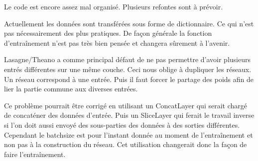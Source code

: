 Le code est encore assez mal organisé. Plusieurs refontes sont à prévoir.

Actuellement les données sont transférées sous forme de dictionnaire. Ce qui 
n'est pas nécessairement des plus pratiques. De façon générale la fonction 
d'entraînement n'est pas très bien pensée et changera sûrement à l'avenir.

Lasagne/Theano a comme principal défaut de ne pas permettre d'avoir plusieurs
entrés différentes sur une même couche. Ceci nous oblige à dupliquer les réseaux.
Un réseau correspond à une entrée. Puis il faut forcer le partage des poids afin
de lier la partie commune aux diverses entrées.

Ce problème pourrait être corrigé en utilisant un ConcatLayer qui serait chargé
de concaténer des données d'entrée. Puis un SliceLayer qui ferait le travail inverse
si l'on doit aussi envoyé des sous-parties des données à des sorties différentes.
Cependant le batchsize est pour l'instant donnée au moment de l'entraînement
et non pas à la construction du réseau. Cet utilisation changerait donc la
façon de faire l'entraînement.

